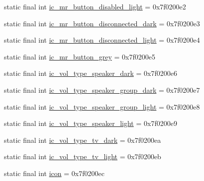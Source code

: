 \begin{CompactItemize}
\item 
static final int \hyperlink{classandroid_1_1support_1_1graphics_1_1drawable_1_1animated_1_1_r_1_1drawable_64d6a748d9c1cee2a8f8561adfe3c728}{ic\_\-mr\_\-button\_\-disabled\_\-light} = 0x7f0200e2
\item 
static final int \hyperlink{classandroid_1_1support_1_1graphics_1_1drawable_1_1animated_1_1_r_1_1drawable_0d6003b20449a5538e36705cc1ebe3d2}{ic\_\-mr\_\-button\_\-disconnected\_\-dark} = 0x7f0200e3
\item 
static final int \hyperlink{classandroid_1_1support_1_1graphics_1_1drawable_1_1animated_1_1_r_1_1drawable_2fa7b3096fa3c2ab30bbec42adf5a7ae}{ic\_\-mr\_\-button\_\-disconnected\_\-light} = 0x7f0200e4
\item 
static final int \hyperlink{classandroid_1_1support_1_1graphics_1_1drawable_1_1animated_1_1_r_1_1drawable_75db4b3bdbd0270616263f0de2369453}{ic\_\-mr\_\-button\_\-grey} = 0x7f0200e5
\item 
static final int \hyperlink{classandroid_1_1support_1_1graphics_1_1drawable_1_1animated_1_1_r_1_1drawable_881b2f8f5d8aa03a0a943857d5feb566}{ic\_\-vol\_\-type\_\-speaker\_\-dark} = 0x7f0200e6
\item 
static final int \hyperlink{classandroid_1_1support_1_1graphics_1_1drawable_1_1animated_1_1_r_1_1drawable_1a44c4214c60e11eec174b79dfa2919e}{ic\_\-vol\_\-type\_\-speaker\_\-group\_\-dark} = 0x7f0200e7
\item 
static final int \hyperlink{classandroid_1_1support_1_1graphics_1_1drawable_1_1animated_1_1_r_1_1drawable_9f8d28323e16f5c2a8e6af013046ae16}{ic\_\-vol\_\-type\_\-speaker\_\-group\_\-light} = 0x7f0200e8
\item 
static final int \hyperlink{classandroid_1_1support_1_1graphics_1_1drawable_1_1animated_1_1_r_1_1drawable_66731bee0b1a29ec48454dfb8b81cf49}{ic\_\-vol\_\-type\_\-speaker\_\-light} = 0x7f0200e9
\item 
static final int \hyperlink{classandroid_1_1support_1_1graphics_1_1drawable_1_1animated_1_1_r_1_1drawable_d3b60d78597106db083a03700fc8832c}{ic\_\-vol\_\-type\_\-tv\_\-dark} = 0x7f0200ea
\item 
static final int \hyperlink{classandroid_1_1support_1_1graphics_1_1drawable_1_1animated_1_1_r_1_1drawable_2730f1d43c2fac2033897a7228f9362d}{ic\_\-vol\_\-type\_\-tv\_\-light} = 0x7f0200eb
\item 
static final int \hyperlink{classandroid_1_1support_1_1graphics_1_1drawable_1_1animated_1_1_r_1_1drawable_ce938acbd8ecca604b5da2d17302e8e0}{icon} = 0x7f0200ec

\end{CompactItemize}
